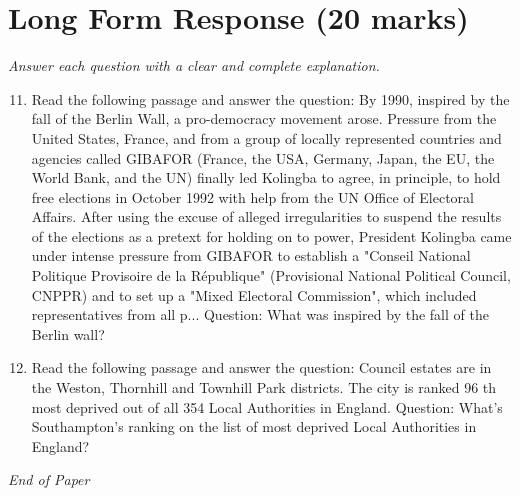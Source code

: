 \documentclass[12pt]{article}
\begin{document}
\section*{Long Form Response (20 marks)}
\textit{Answer each question with a clear and complete explanation.}
\begin{enumerate}[label=\arabic*.]
\setcounter{enumi}{10}
\item Read the following passage and answer the question: By 1990, inspired by the fall of the Berlin Wall, a pro-democracy movement arose. Pressure from the United States, France, and from a group of locally represented countries and agencies called GIBAFOR (France, the USA, Germany, Japan, the EU, the World Bank, and the UN) finally led Kolingba to agree, in principle, to hold free elections in October 1992 with help from the UN Office of Electoral Affairs. After using the excuse of alleged irregularities to suspend the results of the elections as a pretext for holding on to power, President Kolingba came under intense pressure from GIBAFOR to establish a "Conseil National Politique Provisoire de la République" (Provisional National Political Council, CNPPR) and to set up a "Mixed Electoral Commission", which included representatives from all p... Question: What was inspired by the fall of the Berlin wall?
\item Read the following passage and answer the question: Council estates are in the Weston, Thornhill and Townhill Park districts. The city is ranked 96 th most deprived out of all 354 Local Authorities in England. Question: What's Southampton's ranking on the list of most deprived Local Authorities in England?
\end{enumerate}

\vfill
\noindent\textit{End of Paper}
\end{document}
